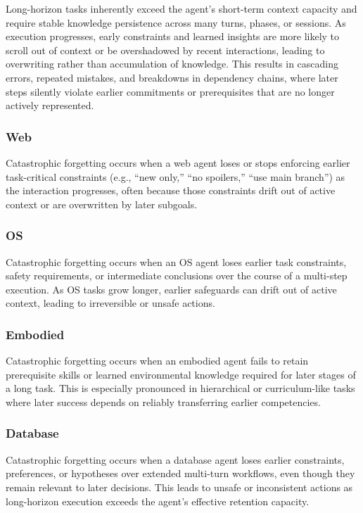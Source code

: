 \documentclass[11pt]{article}
\begin{document}
Long-horizon tasks inherently exceed the agent’s short-term context capacity and require
stable knowledge persistence across many turns, phases, or sessions. As execution
progresses, early constraints and learned insights are more likely to scroll out of context or be
overshadowed by recent interactions, leading to overwriting rather than accumulation of
knowledge. This results in cascading errors, repeated mistakes, and breakdowns in
dependency chains, where later steps silently violate earlier commitments or prerequisites that
are no longer actively represented.
\subsubsection{Web}
Catastrophic forgetting occurs when a web agent loses or stops enforcing earlier task-critical constraints (e.g., “new only,” “no spoilers,” “use main branch”) as the interaction progresses, often because those constraints drift out of active context or are overwritten by later subgoals.

\subsubsection{OS}
Catastrophic forgetting occurs when an OS agent loses earlier task constraints, safety requirements, or intermediate conclusions over the course of a multi-step execution. As OS tasks grow longer, earlier safeguards can drift out of active context, leading to irreversible or unsafe actions.

\subsubsection{Embodied} Catastrophic forgetting occurs when an embodied agent fails to retain prerequisite skills or learned environmental knowledge required for later stages of a long task. This is especially pronounced in hierarchical or curriculum-like tasks where later success depends on reliably transferring earlier competencies.

\subsubsection{Database}
Catastrophic forgetting occurs when a database agent loses earlier constraints, preferences, or hypotheses over extended multi-turn workflows, even though they remain relevant to later decisions. This leads to unsafe or inconsistent actions as long-horizon execution exceeds the agent’s effective retention capacity.
\end{document}
